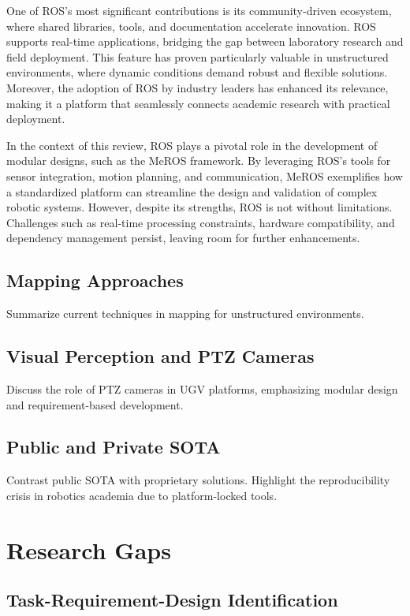 \documentclass[runningheads]{llncs}
\begin{document}
One of ROS's most significant contributions is its community-driven ecosystem, where shared libraries, tools, and documentation accelerate innovation. ROS supports real-time applications, bridging the gap between laboratory research and field deployment. This feature has proven particularly valuable in unstructured environments, where dynamic conditions demand robust and flexible solutions. Moreover, the adoption of ROS by industry leaders has enhanced its relevance, making it a platform that seamlessly connects academic research with practical deployment.

In the context of this review, ROS plays a pivotal role in the development of modular designs, such as the MeROS framework. By leveraging ROS's tools for sensor integration, motion planning, and communication, MeROS exemplifies how a standardized platform can streamline the design and validation of complex robotic systems. However, despite its strengths, ROS is not without limitations. Challenges such as real-time processing constraints, hardware compatibility, and dependency management persist, leaving room for further enhancements.

\subsection{Mapping Approaches}
Summarize current techniques in mapping for unstructured environments.

\subsection{Visual Perception and PTZ Cameras}
Discuss the role of PTZ cameras in UGV platforms, emphasizing modular design and requirement-based development.

\subsection{Public and Private SOTA}
Contrast public SOTA with proprietary solutions. Highlight the reproducibility crisis in robotics academia due to platform-locked tools.

\section{Research Gaps}
\subsection{Task-Requirement-Design Identification}
\end{document}
